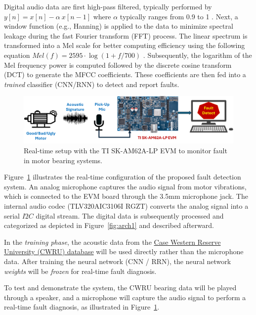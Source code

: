 \documentclass[12pt,twoside]{article}
\begin{document}
Digital audio data are first high-pass filtered, typically performed by $y[n] = x[n] - \alpha~x[n-1]$ where $\alpha$ typically ranges from 0.9 to 1 \cite{han2006efficient}.
Next, a window function (e.g., Hanning) is applied to the data to minimize spectral leakage during the fast Fourier transform (FFT) process. The linear spectrum is transformed into a Mel scale for better computing efficiency using the following equation $Mel(f) = 2595\cdot \log(1 + f/700)$ \cite{han2006efficient}.
Subsequently, the logarithm of the Mel frequency power is computed followed by the discrete cosine transform (DCT) to generate the MFCC coefficients. These coefficients are then fed into a \textit{trained} classifier (CNN/RNN) to detect and report faults.

\begin{figure}[htb]
\centering
\includegraphics[width=1.0\linewidth]{figs/TI-EVM-Setup.png}
\caption{\label{fig:TI-EVM-setup}Real-time setup with the TI SK-AM62A-LP EVM to monitor fault in motor bearing systems.}
\end{figure}

Figure~\ref{fig:TI-EVM-setup} illustrates the real-time configuration of the proposed fault detection system. An analog microphone captures the audio signal from motor vibrations, which is connected to the EVM board through the 3.5mm microphone jack. The internal audio codec (TLV320AIC3106I RGZT) converts the analog signal into a serial $I2C$ digital stream. The digital data is subsequently processed and categorized as depicted in Figure~\ref{fig:arch1} and described afterward. 

In the \textit{training phase}, the acoustic data from the \href{https://engineering.case.edu/bearingdatacenter}{Case Western Reserve University (CWRU) database}\cite{case2019} will be used directly rather than the microphone data. After training the neural network (CNN / RRN), the neural network \textit{weights} will be \textit{frozen} for real-time fault diagnosis.

To test and demonstrate the system, the CWRU bearing data will be played through a speaker, and a microphone will capture the audio signal to perform a real-time fault diagnosis, as illustrated in Figure~\ref{fig:TI-EVM-setup}.
\end{document}
